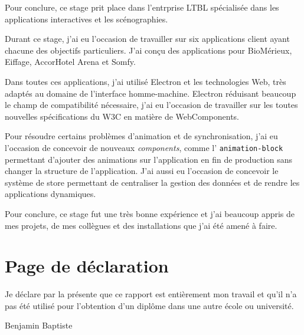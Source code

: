 \documentclass{article}
\newcommand{\components}{\emph{components}\xspace}
\newcommand{\aha}{AccorHotel Arena\xspace}
\begin{document}
    Pour conclure, ce stage prit place dans l'entrprise LTBL spécialisée dans les applications interactives et les scénographies.

    Durant ce stage, j'ai eu l'occasion de travailler sur six applications client ayant chacune des objectifs particuliers.
    J'ai conçu des applications pour BioMérieux, Eiffage, \aha et Somfy.

    Dans toutes ces applications, j'ai utilisé Electron et les technologies Web, très adaptés au domaine de l'interface homme-machine.
    Electron réduisant beaucoup le champ de compatibilité nécessaire, j'ai eu l'occasion de travailler sur les toutes nouvelles spécifications du W3C en matière de WebComponents.

    Pour résoudre certains problèmes d'animation et de synchronisation, j'ai eu l'occasion de concevoir de nouveaux \components, comme l’ \texttt{animation-block} permettant d'ajouter des animations sur l'application en fin de production sans changer la structure de l'application.
    J'ai aussi eu l'occasion de concevoir le système de store permettant de centraliser la gestion des données et de rendre les applications dynamiques.

    Pour conclure, ce stage fut une très bonne expérience et j'ai beaucoup appris de mes projets, de mes collègues et des installations que j'ai été amené à faire.

    \clearpage

    \section{Page de déclaration}

    \vspace{\fill}

    Je déclare par la présente que ce rapport est entièrement mon travail et qu'il n'a pas été utilisé pour l'obtention d'un diplôme dans une autre école ou université.

    \vspace{3cm}

    Benjamin \hspace{\fill}Baptiste 

    \vspace{\fill}
\end{document}
